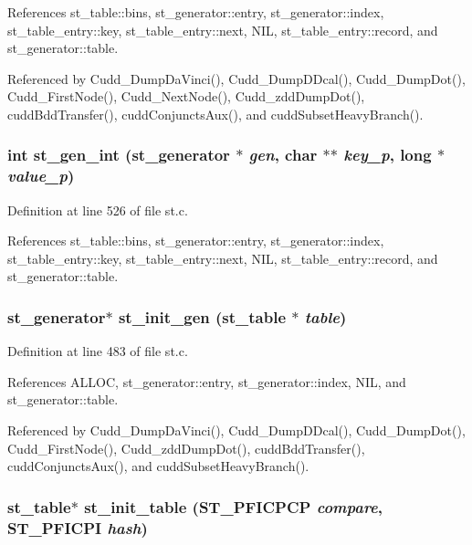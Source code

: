 References st\_\-table::bins, st\_\-generator::entry, st\_\-generator::index, st\_\-table\_\-entry::key, st\_\-table\_\-entry::next, NIL, st\_\-table\_\-entry::record, and st\_\-generator::table.

Referenced by Cudd\_\-Dump\-Da\-Vinci(), Cudd\_\-Dump\-DDcal(), Cudd\_\-Dump\-Dot(), Cudd\_\-First\-Node(), Cudd\_\-Next\-Node(), Cudd\_\-zdd\-Dump\-Dot(), cudd\-Bdd\-Transfer(), cudd\-Conjuncts\-Aux(), and cudd\-Subset\-Heavy\-Branch().
\subsubsection{\setlength{\rightskip}{0pt plus 5cm}int st\_\-gen\_\-int (\bf{st\_\-generator} $\ast$ {\em gen}, char $\ast$$\ast$ {\em key\_\-p}, long $\ast$ {\em value\_\-p})}\label{st_8c_234f6f716bd6ad638bab98457e538ef9}




Definition at line 526 of file st.c.

References st\_\-table::bins, st\_\-generator::entry, st\_\-generator::index, st\_\-table\_\-entry::key, st\_\-table\_\-entry::next, NIL, st\_\-table\_\-entry::record, and st\_\-generator::table.
\subsubsection{\setlength{\rightskip}{0pt plus 5cm}\bf{st\_\-generator}$\ast$ st\_\-init\_\-gen (\bf{st\_\-table} $\ast$ {\em table})}\label{st_8c_2fb7a7c51faa5ae0f14d0520804253d4}




Definition at line 483 of file st.c.

References ALLOC, st\_\-generator::entry, st\_\-generator::index, NIL, and st\_\-generator::table.

Referenced by Cudd\_\-Dump\-Da\-Vinci(), Cudd\_\-Dump\-DDcal(), Cudd\_\-Dump\-Dot(), Cudd\_\-First\-Node(), Cudd\_\-zdd\-Dump\-Dot(), cudd\-Bdd\-Transfer(), cudd\-Conjuncts\-Aux(), and cudd\-Subset\-Heavy\-Branch().
\subsubsection{\setlength{\rightskip}{0pt plus 5cm}\bf{st\_\-table}$\ast$ st\_\-init\_\-table (\bf{ST\_\-PFICPCP} {\em compare}, \bf{ST\_\-PFICPI} {\em hash})}\label{st_8c_24ffe70dd1bb859ac2f650ccf1ba1eda}




